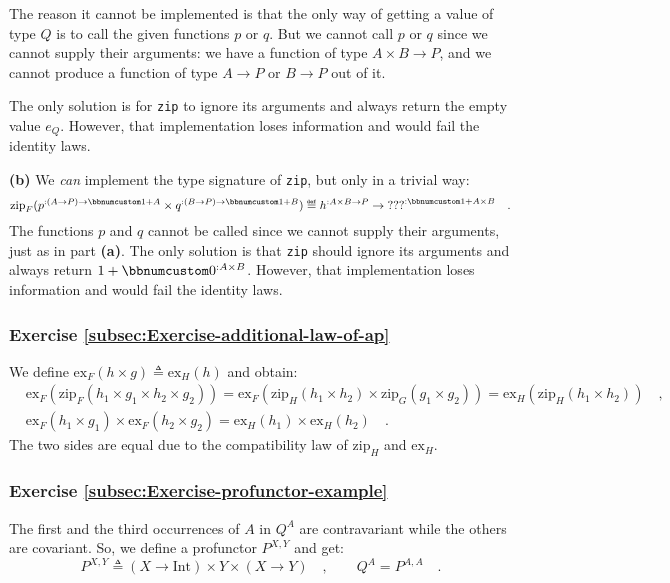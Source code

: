 The reason it cannot be implemented is that the only way of getting
a value of type $Q$ is to call the given functions $p$ or $q$.
But we cannot call $p$ or $q$ since we cannot supply their arguments:
we have a function of type $A\times B\rightarrow P$, and we cannot
produce a function of type $A\rightarrow P$ or $B\rightarrow P$
out of it.

The only solution is for \lstinline!zip! to ignore its arguments
and always return the empty value $e_{Q}$. However, that implementation
loses information and would fail the identity laws.

\textbf{(b)} We \emph{can} implement the type signature of \lstinline!zip!,
but only in a trivial way:
\[
\text{zip}_{F}(p^{:(A\rightarrow P)\rightarrow\bbnum 1+A}\times q^{:(B\rightarrow P)\rightarrow\bbnum 1+B})\triangleq h^{:A\times B\rightarrow P}\rightarrow\text{???}^{:\bbnum 1+A\times B}\quad.
\]
The functions $p$ and $q$ cannot be called since we cannot supply
their arguments, just as in part \textbf{(a)}. The only solution is
that \lstinline!zip! should ignore its arguments and always return
$1+\bbnum 0^{:A\times B}$. However, that implementation loses information
and would fail the identity laws.

\subsubsection*{Exercise \ref{subsec:Exercise-additional-law-of-ap}}

We define $\text{ex}_{F}(h\times g)\triangleq\text{ex}_{H}(h)$ and
obtain:
\begin{align*}
 & \text{ex}_{F}(\text{zip}_{F}(h_{1}\times g_{1}\times h_{2}\times g_{2}))=\text{ex}_{F}(\text{zip}_{H}(h_{1}\times h_{2})\times\text{zip}_{G}(g_{1}\times g_{2}))=\text{ex}_{H}(\text{zip}_{H}(h_{1}\times h_{2}))\quad,\\
 & \text{ex}_{F}(h_{1}\times g_{1})\times\text{ex}_{F}(h_{2}\times g_{2})=\text{ex}_{H}(h_{1})\times\text{ex}_{H}(h_{2})\quad.
\end{align*}
The two sides are equal due to the compatibility law of $\text{zip}_{H}$
and $\text{ex}_{H}$.

\subsubsection*{Exercise \ref{subsec:Exercise-profunctor-example}}

The first and the third occurrences of $A$ in $Q^{A}$ are contravariant
while the others are covariant. So, we define a profunctor $P^{X,Y}$
and get:
\[
P^{X,Y}\triangleq\left(X\rightarrow\text{Int}\right)\times Y\times\left(X\rightarrow Y\right)\quad,\quad\quad Q^{A}=P^{A,A}\quad.
\]


